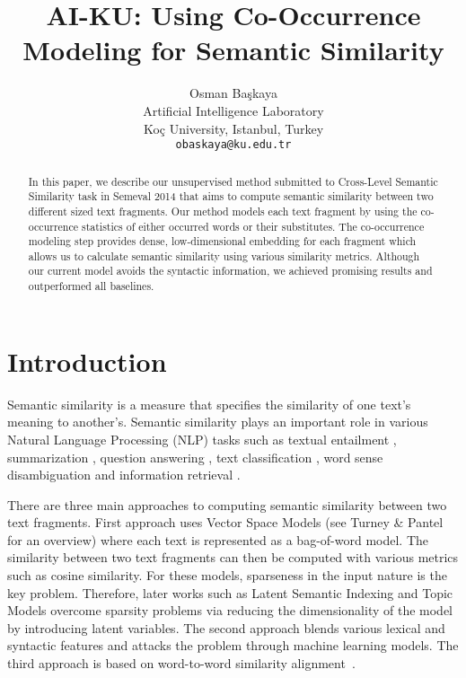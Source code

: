 \documentclass[11pt]{article}
\title{AI-KU: Using Co-Occurrence Modeling for Semantic Similarity}
\author{Osman Ba\c{s}kaya \\
	  Artificial Intelligence Laboratory \\
	  Ko\c{c} University, Istanbul, Turkey \\
  {\tt obaskaya@ku.edu.tr} \\
  }
\date{}
\begin{document}
\maketitle
\begin{abstract}

In this paper, we describe our unsupervised method submitted to Cross-Level Semantic Similarity task in Semeval 2014 that aims to compute semantic similarity between two different sized text fragments. Our method models each text fragment by using the co-occurrence statistics of either occurred words or their substitutes. The co-occurrence modeling step provides dense, low-dimensional embedding for each fragment which allows us to calculate semantic similarity using various similarity metrics. Although our current model avoids the syntactic information, we achieved promising results and outperformed all baselines.

\end{abstract}

\section{Introduction}
\label{intro}

Semantic similarity is a measure that specifies the similarity of one text's meaning to another's. Semantic similarity plays an important role in various Natural Language Processing (NLP) tasks such as textual entailment \cite{berant2012entail}, summarization \cite{lin2003summarization}, question answering \cite{surdeanu2011questionans}, text classification \cite{sebastiani2002textclass}, word sense disambiguation \cite{schutze98automatic} and information retrieval \cite{park2005infret}. 

There are three main approaches to computing semantic similarity between two text fragments. First approach uses Vector Space Models (see Turney \& Pantel  for an overview) where each text is represented as a bag-of-word model. The similarity between two text fragments can then be computed with various metrics such as cosine similarity. For these models, sparseness in the input nature is the key problem. Therefore, later works such as Latent Semantic Indexing  \cite{deerwester90indexing} and Topic Models \cite{blei03latent} overcome sparsity problems via reducing the dimensionality of the model by introducing latent variables. The second approach blends various lexical and syntactic features and attacks the problem through machine learning models. The third approach is based on word-to-word similarity alignment~\cite{pilehvar2013align,islam2008semantic}.
\end{document}
